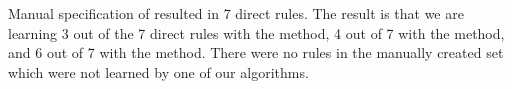 \documentclass[10pt,reprint,nocopyrightspace,numbers]{sigplanconf}
\begin{document}
Manual specification of \AsyncTaskBench{} resulted in 7 direct rules. The result is that we are learning 3 out of the 7 direct rules with the  method, 4 out of 7 with the \pfsa method, and 6 out of 7 with the \hmm method.  There were no rules in the manually created set which were not learned by one of our algorithms.




\end{document}
